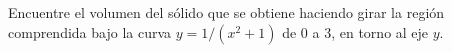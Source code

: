 \item Encuentre el volumen del sólido que se obtiene haciendo girar la región comprendida bajo la curva $y = 1/(x^2 + 1)$ de 0 a 3, en torno al eje $y$.
